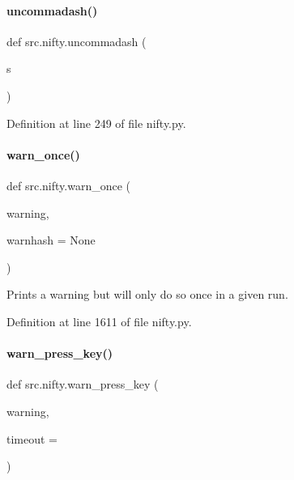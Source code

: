 \mbox{\label{namespacesrc_1_1nifty_a6b37240e93c6469bc27fe8ef3a888763}} 
\paragraph{\texorpdfstring{uncommadash()}{uncommadash()}}
{\footnotesize\ttfamily def src.\+nifty.\+uncommadash (\begin{DoxyParamCaption}\item[{}]{s }\end{DoxyParamCaption})}



Definition at line 249 of file nifty.\+py.

\mbox{\label{namespacesrc_1_1nifty_ab233937d3663f03a912737572c08da9d}} 
\paragraph{\texorpdfstring{warn\+\_\+once()}{warn\_once()}}
{\footnotesize\ttfamily def src.\+nifty.\+warn\+\_\+once (\begin{DoxyParamCaption}\item[{}]{warning,  }\item[{}]{warnhash = {\ttfamily None} }\end{DoxyParamCaption})}



Prints a warning but will only do so once in a given run. 



Definition at line 1611 of file nifty.\+py.

\mbox{\label{namespacesrc_1_1nifty_a6ae2951ba2a22420a11abda6be7e5454}} 
\paragraph{\texorpdfstring{warn\+\_\+press\+\_\+key()}{warn\_press\_key()}}
{\footnotesize\ttfamily def src.\+nifty.\+warn\+\_\+press\+\_\+key (\begin{DoxyParamCaption}\item[{}]{warning,  }\item[{}]{timeout = {} }\end{DoxyParamCaption})}



